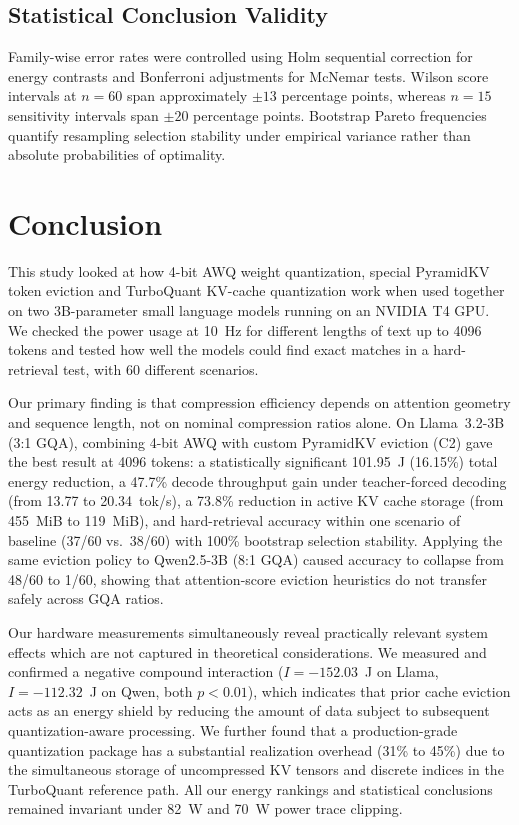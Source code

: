 \documentclass[sigconf,nonacm]{acmart}
\begin{document}
\subsection{Statistical Conclusion Validity}
Family-wise error rates were controlled using Holm sequential correction for energy contrasts and Bonferroni adjustments for McNemar tests. Wilson score intervals at $n=60$ span approximately $\pm 13$ percentage points, whereas $n=15$ sensitivity intervals span $\pm 20$ percentage points. Bootstrap Pareto frequencies quantify resampling selection stability under empirical variance rather than absolute probabilities of optimality.


\section{Conclusion}

This study looked at how 4-bit AWQ weight quantization, special PyramidKV token eviction and TurboQuant KV-cache quantization work when used together on two 3B-parameter small language models running on an NVIDIA T4 GPU. We checked the power usage at 10~Hz for different lengths of text up to 4096 tokens and tested how well the models could find exact matches in a hard-retrieval test, with 60 different scenarios.

Our primary finding is that compression efficiency depends on attention geometry and sequence length, not on nominal compression ratios alone. On Llama~3.2-3B (3:1 GQA), combining 4-bit AWQ with custom PyramidKV eviction (C2) gave the best result at 4096 tokens: a statistically significant 101.95~J (16.15\%) total energy reduction, a 47.7\% decode throughput gain under teacher-forced decoding (from 13.77 to 20.34~tok/s), a 73.8\% reduction in active KV cache storage (from 455~MiB to 119~MiB), and hard-retrieval accuracy within one scenario of baseline (37/60 vs.\ 38/60) with 100\% bootstrap selection stability. Applying the same eviction policy to Qwen2.5-3B (8:1 GQA) caused accuracy to collapse from 48/60 to 1/60, showing that attention-score eviction heuristics do not transfer safely across GQA ratios.

Our hardware measurements simultaneously reveal practically relevant system effects which are not captured in theoretical considerations. We measured and confirmed a negative compound interaction ($I = -152.03$~J on Llama, $I = -112.32$~J on Qwen, both $p < 0.01$), which indicates that prior cache eviction acts as an energy shield by reducing the amount of data subject to subsequent quantization-aware processing. We further found that a production-grade quantization package has a substantial realization overhead (31\% to 45\%) due to the simultaneous storage of uncompressed KV tensors and discrete indices in the TurboQuant reference path. All our energy rankings and statistical conclusions remained invariant under 82~W and 70~W power trace clipping.
\end{document}
